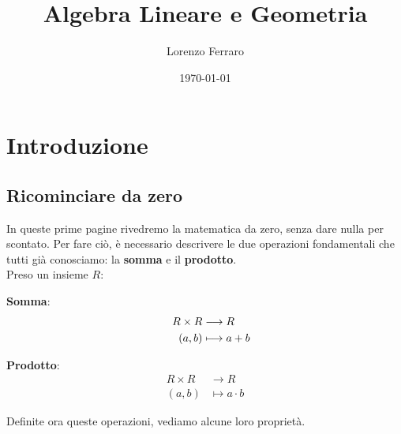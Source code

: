 \documentclass[11pt, a4paper, titlepage, oneside]{scrbook}
\title{Algebra Lineare e Geometria}
\author{Lorenzo Ferraro}
\date{\today}
\begin{document}
\frontmatter
\SapienzaCoverItalianoTriennale
\InfoSegnalazioni

\tableofcontents

\mainmatter

\chapter{Introduzione}

\section{Ricominciare da zero}

In queste prime pagine rivedremo la matematica da zero, senza dare nulla per scontato. 
Per fare ciò, è necessario descrivere le due operazioni fondamentali che tutti già conosciamo: la \textbf{somma} e il \textbf{prodotto}. \\
Preso un insieme $R$:

\bigskip

\begin{minipage}[c]{0.45\textwidth}
    \centering
    {\Large\textbf{Somma}:}
    \begin{align*}
        \hspace{0.4cm}R \times R &\longrightarrow R \\
        \hspace{0.4cm}(a,b) &\longmapsto a + b
    \end{align*}
\end{minipage}
\begin{minipage}[c]{0.45\textwidth}
    \centering
    {\Large\textbf{Prodotto}:}
    \begin{align*}
        R \times R &\longrightarrow R \\
        (a,b) &\longmapsto a \cdot b
    \end{align*}
\end{minipage}

\bigskip

Definite ora queste operazioni, vediamo alcune loro proprietà.
\end{document}
